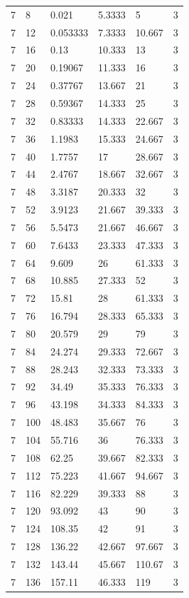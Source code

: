 \begin{tabular}{|p{0.6cm}|p{0.5cm}|p{1.15cm}|p{1cm}|p{1cm}|p{0.7cm}|}
7 & 8 & 0.021 & 5.3333 & 5 & 3 \\
7 & 12 & 0.053333 & 7.3333 & 10.667 & 3 \\
7 & 16 & 0.13 & 10.333 & 13 & 3 \\
7 & 20 & 0.19067 & 11.333 & 16 & 3 \\
7 & 24 & 0.37767 & 13.667 & 21 & 3 \\
7 & 28 & 0.59367 & 14.333 & 25 & 3 \\
7 & 32 & 0.83333 & 14.333 & 22.667 & 3 \\
7 & 36 & 1.1983 & 15.333 & 24.667 & 3 \\
7 & 40 & 1.7757 & 17 & 28.667 & 3 \\
7 & 44 & 2.4767 & 18.667 & 32.667 & 3 \\
7 & 48 & 3.3187 & 20.333 & 32 & 3 \\
7 & 52 & 3.9123 & 21.667 & 39.333 & 3 \\
7 & 56 & 5.5473 & 21.667 & 46.667 & 3 \\
7 & 60 & 7.6433 & 23.333 & 47.333 & 3 \\
7 & 64 & 9.609 & 26 & 61.333 & 3 \\
7 & 68 & 10.885 & 27.333 & 52 & 3 \\
7 & 72 & 15.81 & 28 & 61.333 & 3 \\
7 & 76 & 16.794 & 28.333 & 65.333 & 3 \\
7 & 80 & 20.579 & 29 & 79 & 3 \\
7 & 84 & 24.274 & 29.333 & 72.667 & 3 \\
7 & 88 & 28.243 & 32.333 & 73.333 & 3 \\
7 & 92 & 34.49 & 35.333 & 76.333 & 3 \\
7 & 96 & 43.198 & 34.333 & 84.333 & 3 \\
7 & 100 & 48.483 & 35.667 & 76 & 3 \\
7 & 104 & 55.716 & 36 & 76.333 & 3 \\
7 & 108 & 62.25 & 39.667 & 82.333 & 3 \\
7 & 112 & 75.223 & 41.667 & 94.667 & 3 \\
7 & 116 & 82.229 & 39.333 & 88 & 3 \\
7 & 120 & 93.092 & 43 & 90 & 3 \\
7 & 124 & 108.35 & 42 & 91 & 3 \\
7 & 128 & 136.22 & 42.667 & 97.667 & 3 \\
7 & 132 & 143.44 & 45.667 & 110.67 & 3 \\
7 & 136 & 157.11 & 46.333 & 119 & 3 \\

\end{tabular}
